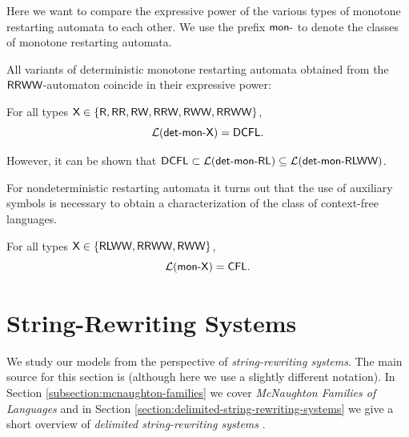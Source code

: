 Here we want to compare the expressive power of the various types of monotone restarting automata to each other. We use the prefix \index{$\monPrefix$}$\monPrefix$ to denote the classes of monotone restarting automata.

All variants of deterministic monotone restarting automata obtained from the $\textup{\sf RRWW}$-automaton coincide in their expressive power:

\begin{theorem}
For all types $\textup{\sf X} \in \{\textup{\sf R}, \textup{\sf RR}, \textup{\sf RW}, \textup{\sf RRW}, \textup{\sf RWW}, \textup{\sf RRWW}\}$, $${\cal L}(\textup{\sf det-mon-X}) = \textup{\sf DCFL}.$$
\end{theorem}

\noindent However, it can be shown that $\textup{\sf DCFL} \subset {\cal L}(\textup{\sf det-mon-RL}) \subseteq {\cal L}(\textup{\sf det-mon-RLWW})$.

For nondeterministic restarting automata it turns out that the use of auxiliary symbols is necessary to obtain a characterization of the class of context-free languages.

\begin{theorem}
For all types $\textup{\sf X} \in \{\textup{\sf RLWW}, \textup{\sf RRWW}, \textup{\sf RWW}\}$, $${\cal L}(\textup{\sf mon-X}) = \textup{\sf CFL}.$$
\end{theorem}

\section{String-Rewriting Systems}
\label{section:string-rewriting-systems}

We study our models from the perspective of \emph{string-rewriting systems}. The main source for this section is \citep{bookOtto93} (although here we use a slightly different notation). In Section \ref{subsection:mcnaughton-families} we cover \emph{McNaughton Families of Languages} \citep{Beaudry2003} and in Section \ref{section:delimited-string-rewriting-systems} we give a short overview of \emph{delimited string-rewriting systems} \citep{Eyraud2007}.

